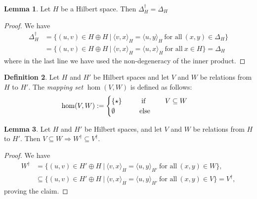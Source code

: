 \documentclass{article}
\numberwithin{equation}{section}
\theoremstyle{definition}
\newtheorem{definition}{Definition}[subsection]
\newtheorem{lemma}[definition]{Lemma}
\theoremstyle{theorem}
\begin{document}
\begin{lemma}\label{Lemma: the adjoint of the diagonal is the diagonal}
    Let $H$ be a Hilbert space. Then $\Delta_H^\dagger = \Delta_H$
\end{lemma}
\begin{proof}
    We have 
    \begin{align*}
        \Delta_H^\dagger 
        &= \{(u,v) \in H \oplus H \ | \ \langle v,x \rangle_{H} = 
            \langle u,y \rangle_{H} \ \text{for all} \ (x,y) \in \Delta_H \} \\
        &= \{(u,v) \in H \oplus H \ | \ \langle v,x \rangle_{H} = 
            \langle u,x \rangle_{H} \ \text{for all} \ x \in H \} 
        = \Delta_H
    \end{align*}
    where in the last line we have used the non-degeneracy of the inner product.
\end{proof}
\begin{definition}\label{Definition: Mapping sets of relations}
    Let $H$ and $H'$ be Hilbert spaces and let $V$ and $W$ be relations from $H$ to $H'$. The \emph{mapping set} $\hom(V,W)$ is defined as follows: 
    \begin{equation}
        \hom(V,W) := 
        \begin{cases}
            \{\star\} \hspace{1cm} \text{if} \hspace{1cm} V \subseteq W \\
            \emptyset \hspace{1.25cm} \text{else}\\
        \end{cases}
    \end{equation}
\end{definition}
\begin{lemma}\label{Lemma: inclusion and adjoints for relations}
    Let $H$ and $H'$ be Hilbert spaces, and let $V$ and $W$ be relations from $H$ to $H'$. Then $V \subseteq W \Rightarrow W^\dagger \subseteq V^\dagger$.
\end{lemma}
\begin{proof}
    We have 
    \begin{align*}
        W^\dagger 
        &= \{(u,v) \in H' \oplus H \ | \ \langle v,x \rangle_{H} = \langle u,y \rangle_{H'} \ \text{for all} \ (x,y) \in W \},\\
        &\subseteq \{(u,v) \in H' \oplus H \ | \ \langle v,x \rangle_{H} = \langle u,y \rangle_{H'} \ \text{for all} \ (x,y) \in V \}
        = V^\dagger,
    \end{align*}
    proving the claim.
\end{proof}
\end{document}
